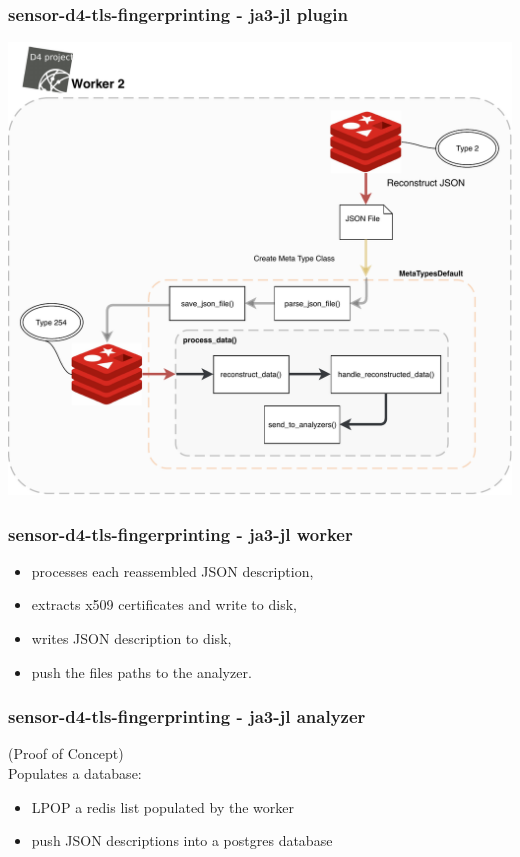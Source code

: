 \documentclass{beamer}
\begin{document}
\begin{frame}
        \frametitle{sensor-d4-tls-fingerprinting - ja3-jl plugin} 
              \begin{center}
                \includegraphics[scale=0.4]{d4-worker2-ja3-jl.pdf}
              \end{center}
\end{frame}

\begin{frame}[fragile]
        \frametitle{sensor-d4-tls-fingerprinting - ja3-jl worker} 
        
        \begin{itemize}
          \item processes each reassembled JSON description,
          \item extracts x509 certificates and write to disk,
          \item writes JSON description to disk,
          \item push the files paths to the analyzer.
        \end{itemize}
\end{frame}

\begin{frame}[fragile]
        \frametitle{sensor-d4-tls-fingerprinting - ja3-jl analyzer} 
        (Proof of Concept) \\
        \vspace{.8cm} 
        Populates a database:
        \begin{itemize}
          \item LPOP a redis list populated by the worker
          \item push JSON descriptions into a postgres database
        \end{itemize}
\end{frame}
\end{document}
